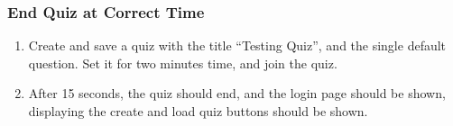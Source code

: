 \subsubsection{End Quiz at Correct Time} %
\label{ssub:end_quiz_at_correct_time}
\begin{enumerate}[leftmargin=*]
\item Create and save a quiz with the title ``Testing Quiz'', and the single default question. Set it for two minutes time, and join the quiz.
\item After 15 seconds, the quiz should end, and the login page should be shown, displaying the create and load quiz buttons should be shown.
\end{enumerate}
